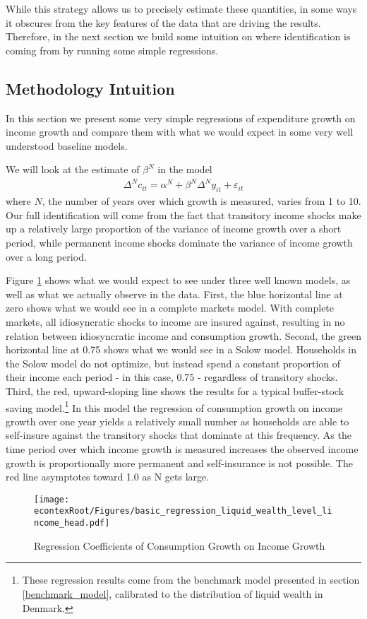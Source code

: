 \documentclass[titlepage]{\econtex}\newcommand{\texname}{ConsumptionHeterogeneity}
\begin{document}
 While this strategy allows us to precisely estimate these quantities, in some ways it obscures from the key features of the data that are driving the results. Therefore, in the next section we build some intuition on where identification is coming from by running some simple regressions.

\subsection{Methodology Intuition}
In this section we present some very simple regressions of expenditure growth on income growth and compare them with what we would expect in some very well understood baseline models.

We will look at the estimate of $\beta^N$ in the model
\begin{align*}
    \Delta^N c_{it} = \alpha^N + \beta^N \Delta^N y_{it} + \varepsilon_{it}
\end{align*}
where $N$, the number of years over which growth is measured, varies from 1 to 10. Our full identification will come from the fact that transitory income shocks make up a relatively large proportion of the variance of income growth over a short period, while permanent income shocks dominate the variance of income growth over a long period.

Figure \ref{fig:GrowthReg} shows what we would expect to see under three well known models, as well as what we actually observe in the data. First, the blue horizontal line at zero shows what we would see in a complete markets model. With complete markets, all idiosyncratic shocks to income are insured against, resulting in no relation between idiosyncratic income and consumption growth. Second, the green horizontal line at 0.75 shows what we would see in a Solow model. Households in the Solow model do not optimize, but instead spend a constant proportion of their income each period - in this case, 0.75 - regardless of transitory shocks. Third, the red, upward-sloping line shows the results for a typical buffer-stock saving model.\footnote{These regression results come from the benchmark model presented in section \ref{benchmark_model}, calibrated to the distribution of liquid wealth in Denmark.} In this model the regression of consumption growth on income growth over one year yields a relatively small number as households are able to self-insure against the transitory shocks that dominate at this frequency. As the time period over which income growth is measured increases the observed income growth is proportionally more permanent and self-insurance is not possible. The red line asymptotes toward 1.0 as N gets large.
	\begin{figure} 
	\begin{centering}
		\texttt{[image: \\econtexRoot/Figures/basic\_regression\_liquid\_wealth\_level\_lincome\_head.pdf]}
		\caption{Regression Coefficients of Consumption Growth on Income Growth}
		\label{fig:GrowthReg}
	\end{centering}
\end{figure}
\end{document}
